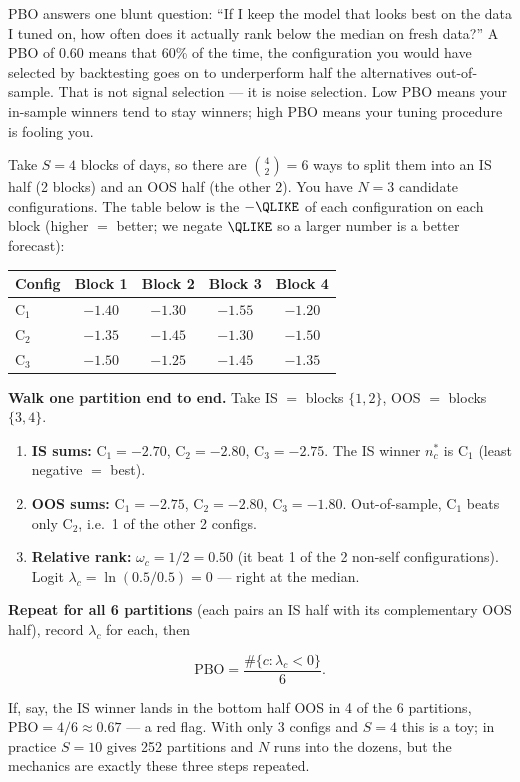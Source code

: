 \begin{intuition}
PBO answers one blunt question: ``If I keep the model that looks best on the data I tuned on, how often does it actually rank below the median on fresh data?''
A PBO of $0.60$ means that 60\% of the time, the configuration you would have selected by backtesting goes on to underperform half the alternatives out-of-sample.
That is not signal selection --- it is noise selection.
Low PBO means your in-sample winners tend to stay winners; high PBO means your tuning procedure is fooling you.
\end{intuition}

\begin{workedexample}[CSCV by Hand: $S=4$, Three Configurations]
Take $S = 4$ blocks of days, so there are $\binom{4}{2} = 6$ ways to split them into an IS half (2 blocks) and an OOS half (the other 2).
You have $N = 3$ candidate configurations.
The table below is the $-\QLIKE$ of each configuration on each block (higher $=$ better; we negate $\QLIKE$ so a larger number is a better forecast):

\medskip
\begin{center}
\begin{tabular}{lcccc}
\toprule
Config & Block 1 & Block 2 & Block 3 & Block 4 \\
\midrule
$\text{C}_1$ & $-1.40$ & $-1.30$ & $-1.55$ & $-1.20$ \\
$\text{C}_2$ & $-1.35$ & $-1.45$ & $-1.30$ & $-1.50$ \\
$\text{C}_3$ & $-1.50$ & $-1.25$ & $-1.45$ & $-1.35$ \\
\bottomrule
\end{tabular}
\end{center}
\medskip

\textbf{Walk one partition end to end.}
Take IS $=$ blocks $\{1,2\}$, OOS $=$ blocks $\{3,4\}$.
\begin{enumerate}[nosep]
  \item \textbf{IS sums:} $\text{C}_1 = -2.70$, $\text{C}_2 = -2.80$, $\text{C}_3 = -2.75$. The IS winner $n^*_c$ is $\text{C}_1$ (least negative $=$ best).
  \item \textbf{OOS sums:} $\text{C}_1 = -2.75$, $\text{C}_2 = -2.80$, $\text{C}_3 = -1.80$. Out-of-sample, $\text{C}_1$ beats only $\text{C}_2$, i.e.\ 1 of the other 2 configs.
  \item \textbf{Relative rank:} $\omega_c = 1/2 = 0.50$ (it beat 1 of the 2 non-self configurations). Logit $\lambda_c = \ln(0.5/0.5) = 0$ --- right at the median.
\end{enumerate}

\textbf{Repeat for all 6 partitions} (each pairs an IS half with its complementary OOS half), record $\lambda_c$ for each, then

\[
\text{PBO} = \frac{\#\{c : \lambda_c < 0\}}{6}.
\]

If, say, the IS winner lands in the bottom half OOS in 4 of the 6 partitions, $\text{PBO} = 4/6 \approx 0.67$ --- a red flag.
With only 3 configs and $S=4$ this is a toy; in practice $S = 10$ gives 252 partitions and $N$ runs into the dozens, but the mechanics are exactly these three steps repeated.
\end{workedexample}

